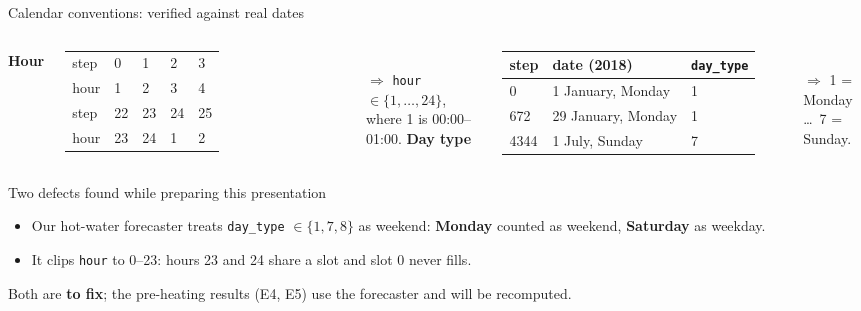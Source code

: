 \documentclass[aspectratio=169,10pt]{beamer}
\newcommand{\tagtodo}{\textcolor{stemsred}{\textbf{to fix}}}
\begin{document}
\begin{frame}{Calendar conventions: verified against real dates}
\begin{columns}[T]
\textbf{Hour}\\[2pt]
\small
\begin{tabular}{@{}lllll@{}}
\toprule
step & 0 & 1 & 2 & 3 \\
hour & 1 & 2 & 3 & 4 \\
\midrule
step & 22 & 23 & 24 & 25 \\
hour & 23 & 24 & 1 & 2 \\
\bottomrule
\end{tabular}\\[4pt]
\normalsize $\Rightarrow$ \texttt{hour} $\in \{1,\dots,24\}$, where 1 is 00:00--01:00.
\textbf{Day type}\\[2pt]
\small
\begin{tabular}{@{}lll@{}}
\toprule
step & date (2018) & \texttt{day\_type} \\
\midrule
0 & 1 January, Monday & 1 \\
672 & 29 January, Monday & 1 \\
4344 & 1 July, Sunday & 7 \\
\bottomrule
\end{tabular}\\[4pt]
\normalsize $\Rightarrow$ 1 = Monday \dots\ 7 = Sunday.
\end{columns}
\vspace{0.6em}
\begin{alertblock}{Two defects found while preparing this presentation}
\begin{itemize}
  \item Our hot-water forecaster treats \texttt{day\_type} $\in\{1,7,8\}$ as weekend: \textbf{Monday} counted as weekend, \textbf{Saturday} as weekday.
  \item It clips \texttt{hour} to 0--23: hours 23 and 24 share a slot and slot 0 never fills.
\end{itemize}
Both are \tagtodo; the pre-heating results (E4, E5) use the forecaster and will be recomputed.
\end{alertblock}
\end{frame}
\end{document}
